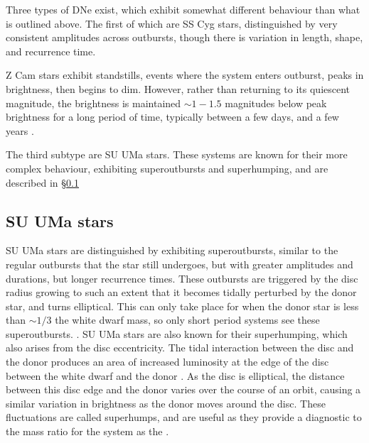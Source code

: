 Three types of DNe exist, which exhibit somewhat different behaviour than what is outlined above. The first of which are SS Cyg stars, distinguished by very consistent amplitudes across outbursts, though there is variation in length, shape, and recurrence time.

Z Cam stars exhibit standstills, events where the system enters outburst, peaks in brightness, then begins to dim. However, rather than returning to its quiescent magnitude, the brightness is maintained $\sim 1-1.5$ magnitudes below peak brightness for a long period of time, typically between a few days, and a few years \citep{simonsen2014}.

The third subtype are SU UMa stars. These systems are known for their more complex behaviour, exhibiting superoutbursts and superhumping, and are described in \S\ref{sect:introduction:SU UMa}

\subsection{SU UMa stars}
\label{sect:introduction:SU UMa}

SU UMa stars are distinguished by exhibiting superoutbursts, similar to the regular outbursts that the star still undergoes, but with greater amplitudes and durations, but longer recurrence times. These outbursts are triggered by the disc radius growing to such an extent that it becomes tidally perturbed by the donor star, and turns elliptical. This can only take place for when the donor star is less than $\sim 1/3$ the white dwarf mass, so only short period systems see these superoutbursts. \citep{hellier2001}. 
SU UMa stars are also known for their superhumping, which also arises from the disc eccentricity. The tidal interaction between the disc and the donor produces an area of increased luminosity at the edge of the disc between the white dwarf and the donor \citep{warner1988}. As the disc is elliptical, the distance between this disc edge and the donor varies over the course of an orbit, causing a similar variation in brightness as the donor moves around the disc.
These fluctuations are called superhumps, and are useful as they provide a diagnostic to the mass ratio for the system as the  \citep{Patterson1998, Patterson2001, patterson2005}. 

